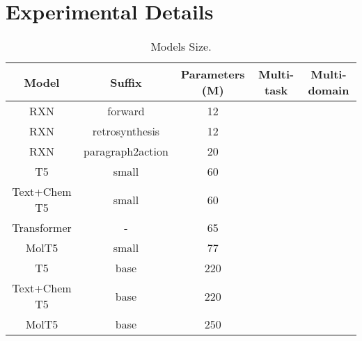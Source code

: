 \documentclass[nohyperref]{article}
\newcommand{\cmark}{{\color{dartmouthgreen} \ding{51}}}
\newcommand{\xmark}{{\color{red} \ding{55}}}
\theoremstyle{plain}
\theoremstyle{definition}
\theoremstyle{remark}
\begin{document}
\section{Experimental Details}
\label{app:details}

\begin{table}[ht]
    \centering
    \caption{Models Size.}
    \begin{tabular}{c c | c c c}
    \toprule
         Model & Suffix  & Parameters (M) & Multi-task & Multi-domain \\
         \midrule
         RXN &  forward           & 12  & \xmark & \xmark \\
         RXN &  retrosynthesis    & 12  & \xmark & \xmark \\
         RXN &  paragraph2action  & 20  & \xmark & \xmark \\
         \midrule
         T5           & small     & 60  & \cmark & \xmark \\
         Text+Chem T5 & small     & 60  & \cmark & \cmark \\
         Transformer  &   -       &  65 & \cmark & \xmark \\
         MolT5        & small     & 77  & \xmark & \cmark \\
         \midrule
         T5           & base      & 220 & \cmark & \xmark \\
         Text+Chem T5 & base      & 220 & \cmark & \cmark \\
         MolT5        & base      & 250 & \xmark & \cmark \\
         \bottomrule
    \end{tabular}
    \label{tab:model-size}
\end{table}
\end{document}
